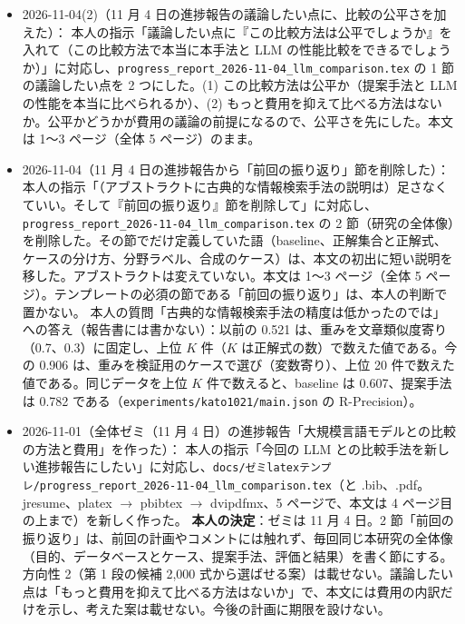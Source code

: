 \documentclass[11pt,a4paper]{jsarticle}
\begin{document}
\begin{itemize}[nosep]
    本人の指摘「『データベースとクエリを渡すだけで LLM が提案手法と同じ精度を出せるなら、提案手法を訓練して使う意味は小さい』は正しくない。本手法の目標は高精度だけではなく、すべての数式の出典をたどれることもある」に対応し、\texttt{progress\_report\_2026-11-04\_llm\_comparison.tex} の 2.1 節からこの文を削除した。前後の文（LLM は式を自ら選べる可能性がある、そこで同じデータベースとクエリを渡して比べる）だけでつながる。本文は 1〜3 ページ（全体 5 ページ）のまま。
  \item 2026-11-04(2)（11 月 4 日の進捗報告の議論したい点に、比較の公平さを加えた）：
    本人の指示「議論したい点に『この比較方法は公平でしょうか』を入れて（この比較方法で本当に本手法と LLM の性能比較をできるでしょうか）」に対応し、\texttt{progress\_report\_2026-11-04\_llm\_comparison.tex} の 1 節の議論したい点を 2 つにした。(1) この比較方法は公平か（提案手法と LLM の性能を本当に比べられるか）、(2) もっと費用を抑えて比べる方法はないか。公平かどうかが費用の議論の前提になるので、公平さを先にした。本文は 1〜3 ページ（全体 5 ページ）のまま。
  \item 2026-11-04（11 月 4 日の進捗報告から「前回の振り返り」節を削除した）：
    本人の指示「（アブストラクトに古典的な情報検索手法の説明は）足さなくていい。そして『前回の振り返り』節を削除して」に対応し、\texttt{progress\_report\_2026-11-04\_llm\_comparison.tex} の 2 節（研究の全体像）を削除した。その節でだけ定義していた語（baseline、正解集合と正解式、ケースの分け方、分野ラベル、合成のケース）は、本文の初出に短い説明を移した。アブストラクトは変えていない。本文は 1〜3 ページ（全体 5 ページ）。テンプレートの必須の節である「前回の振り返り」は、本人の判断で置かない。
    本人の質問「古典的な情報検索手法の精度は低かったのでは」への答え（報告書には書かない）：以前の 0.521 は、重みを文章類似度寄り（0.7、0.3）に固定し、上位 $K$ 件（$K$ は正解式の数）で数えた値である。今の 0.906 は、重みを検証用のケースで選び（変数寄り）、上位 20 件で数えた値である。同じデータを上位 $K$ 件で数えると、baseline は 0.607、提案手法は 0.782 である（\texttt{experiments/kato1021/main.json} の R-Precision）。
  \item 2026-11-01（全体ゼミ（11 月 4 日）の進捗報告「大規模言語モデルとの比較の方法と費用」を作った）：
    本人の指示「今回の LLM との比較手法を新しい進捗報告にしたい」に対応し、\texttt{docs/ゼミlatexテンプレ/progress\_report\_2026-11-04\_llm\_comparison.tex}（と .bib、.pdf。jresume、platex $\to$ pbibtex $\to$ dvipdfmx、5 ページで、本文は 4 ページ目の上まで）を新しく作った。
    \textbf{本人の決定}：ゼミは 11 月 4 日。2 節「前回の振り返り」は、前回の計画やコメントには触れず、毎回同じ本研究の全体像（目的、データベースとケース、提案手法、評価と結果）を書く節にする。方向性 2（第 1 段の候補 2{,}000 式から選ばせる案）は載せない。議論したい点は「もっと費用を抑えて比べる方法はないか」で、本文には費用の内訳だけを示し、考えた案は載せない。今後の計画に期限を設けない。

\end{itemize}
\end{document}

